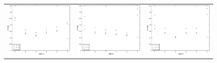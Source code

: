              \begin{figure}
                \begin{center}

                    \begin{tabular}{ccc}
                        \includegraphics{graficos/exp3-partidos-liga2-K.pdf} & \includegraphics{graficos/exp3-partidos-liga4-K.pdf} &
                        \includegraphics{graficos/exp3-partidos-liga5-K.pdf}}

\end{tabular}
\end{center}
\end{figure}
